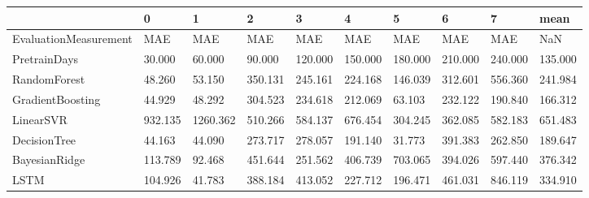 \begin{tabular}{llllllllll}
\toprule
{} &       0 &        1 &       2 &       3 &       4 &       5 &       6 &       7 &    mean \\
\midrule
EvaluationMeasurement &     MAE &      MAE &     MAE &     MAE &     MAE &     MAE &     MAE &     MAE &     NaN \\
PretrainDays          &  30.000 &   60.000 &  90.000 & 120.000 & 150.000 & 180.000 & 210.000 & 240.000 & 135.000 \\
RandomForest          &  48.260 &   53.150 & 350.131 & 245.161 & 224.168 & 146.039 & 312.601 & 556.360 & 241.984 \\
GradientBoosting      &  44.929 &   48.292 & 304.523 & 234.618 & 212.069 &  63.103 & 232.122 & 190.840 & 166.312 \\
LinearSVR             & 932.135 & 1260.362 & 510.266 & 584.137 & 676.454 & 304.245 & 362.085 & 582.183 & 651.483 \\
DecisionTree          &  44.163 &   44.090 & 273.717 & 278.057 & 191.140 &  31.773 & 391.383 & 262.850 & 189.647 \\
BayesianRidge         & 113.789 &   92.468 & 451.644 & 251.562 & 406.739 & 703.065 & 394.026 & 597.440 & 376.342 \\
LSTM                  & 104.926 &   41.783 & 388.184 & 413.052 & 227.712 & 196.471 & 461.031 & 846.119 & 334.910 \\
\bottomrule
\end{tabular}
